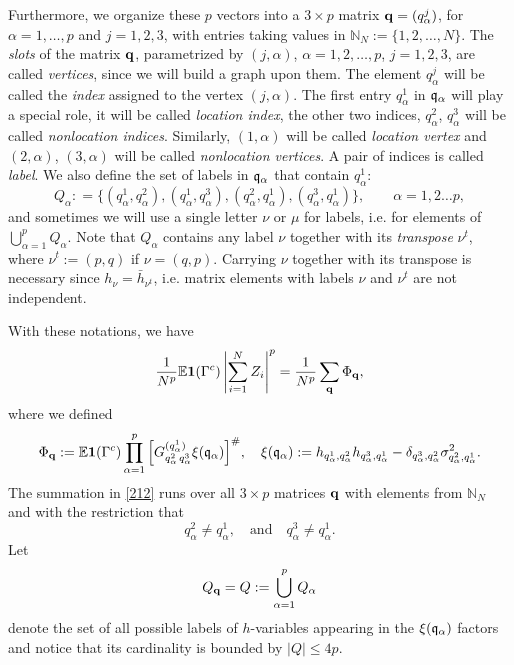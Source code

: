 \documentclass[draft]{article}
\newcommand{\bq}{{\bf {q}}}
\newcommand{\fq}{{\frak q}}
\newcommand{\al}{\alpha}
\newcommand{\be}{\begin{equation}}
\newcommand{\ee}{\end{equation}}
\newcommand{\E}{{\mathbb E }}
\newcommand{\N}{{\mathbb N}}
\numberwithin{equation}{section}
\numberwithin{theorem}{section}
\numberwithin{definition}{section}
\numberwithin{remark}{section}
\begin{document}
 Furthermore, we organize these
$p$ vectors into a $3\times p$ matrix 
$\bq = (q_\alpha^j)$, for $\alpha =1, \ldots, p$ 
 and $j = 1, 2, 3$, with
entries taking values in $ \N_N:=\{ 1,2,\ldots, N\}$.
 The {\it slots}
 of the matrix $\bq$, parametrized by $(j,\al)$, $\al=1,2, \ldots ,p$,
 $j=1,2,3$,
are called {\it vertices}, since we will build a graph upon them. 
The element $q_\al^j$ will be called the {\it index} assigned to
the vertex $(j, \al)$. 
The first entry $q_\al^1$ in $\fq_\al$  will play a special role, it will
be called {\it location index}, the other two indices, $q_\al^2$, $q_\al^3$
will be called {\it nonlocation indices}. Similarly,
$(1, \al)$ will be called {\it location vertex} and 
$(2, \al)$, $(3,\al)$ will be called {\it nonlocation vertices}.
A pair of indices is called {\it label}.
We also define the set of labels in $\fq_\al$ that contain $q^1_\al$:
$$
Q_\al : = \{ (q^1_\al, q^2_\al), (q^1_\al, q^3_\al),
 (q^2_\al, q^1_\al) ,(q^3_\al, q^1_\al) \}, \qquad \al=1,2 \ldots p,
$$
and sometimes we will use a single letter $\nu$ or $\mu$ for labels, i.e.
for elements of $\bigcup_{\al=1}^p Q_\al$. Note that $ Q_\al$ contains
any label $\nu$ together with its {\it transpose} $\nu^t$,
where $\nu^t:= (p,q)$ if $\nu =(q,p)$. Carrying $\nu$ together with 
its transpose is necessary since $h_\nu = \bar h_{\nu^t}$, i.e.
matrix elements with labels $\nu$ and $\nu^t$ are not independent.


With these notations, we have 
 \be\label{212}
 \frac{1}{N^p} \E  {\bf 1} (\Gamma^c) \left|\sum_{i=1}^N Z_i \right|^p
= \frac{1}{N^p}  \sum_{\bq}   \Phi_{\bq},
 \ee 
where we defined  
\be\label{PHI}
 \Phi_{\bq} :=   \E   {\bf 1} (\Gamma^c)
      \prod_{\alpha=1}^{p} \Big[ G^{(q_\alpha^1)}_{q_\alpha^2 \,q_\alpha^3}
 \xi (\fq_\alpha)\Big]^\#,   
      \quad \xi (\fq_\al):= h_{q^1_\al, q^2_\al}
  h_{q_\alpha^3, q_\alpha^1} -\delta_{q^3_\alpha,  q^2_\alpha}
  \sigma^2_{q^2_\alpha, q^1_\alpha}.
\ee
The summation in \eqref{212} runs over all $3\times p$ matrices ${\bf q}$ 
with elements from $\N_N$ and with the restriction that 
\be
q_\al^2\ne q_\al^1, \quad \mbox{and} \quad
q_\al^3\ne q_\al^1.
\label{rest}
\ee
Let 
\be
Q_\bq=Q:= \bigcup_{\al=1}^p Q_\al 
\label{def:A}
\ee 
denote the set of all possible labels of $h$-variables appearing
in the $\xi(\fq_\al)$ factors and notice that its cardinality
is bounded by $|Q|\le 4p$. 
\end{document}
